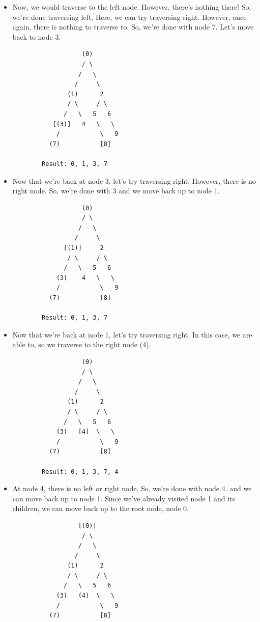 \documentclass[letterpaper]{article}
\begin{document}
\begin{itemize}
    \item Now, we would traverse to the left node. However, there's nothing there! So, we're done traversing left. Here, we can try traversing right. However, once again, there is nothing to traverse to. So, we're done with node 7. Let's move back to node 3. 
    \begin{verbatim}
                   (0)
                   / \
                  /   \
                 /     \
               (1)      2 
               / \     / \ 
              /   \   5   6
           [(3)]   4   \   \ 
            /           \   9
          (7)           [8]

        Result: 0, 1, 3, 7
    \end{verbatim}

    \item Now that we're back at node 3, let's try traversing right. However, there is no right node. So, we're done with 3 and we move back up to node 1.
    \begin{verbatim}
                   (0)
                   / \
                  /   \
                 /     \
              [(1)]     2 
               / \     / \ 
              /   \   5   6
            (3)    4   \   \ 
            /           \   9
          (7)           [8]

        Result: 0, 1, 3, 7
    \end{verbatim}

    \item Now that we're back at node 1, let's try traversing right. In this case, we are able to, so we traverse to the right node (4).
    \begin{verbatim}
                   (0)
                   / \
                  /   \
                 /     \
               (1)      2 
               / \     / \ 
              /   \   5   6
            (3)   [4]  \   \ 
            /           \   9
          (7)           [8]

        Result: 0, 1, 3, 7, 4
    \end{verbatim}

    \item At node 4, there is no left or right node. So, we're done with node 4. and we can move back up to node 1. Since we've already visited node 1 and its children, we can move back up to the root node, node 0. 
    \begin{verbatim}
                  [(0)]
                   / \
                  /   \
                 /     \
               (1)      2 
               / \     / \ 
              /   \   5   6
            (3)   (4)  \   \ 
            /           \   9
          (7)           [8]


\end{verbatim}
\end{itemize}
\end{document}
